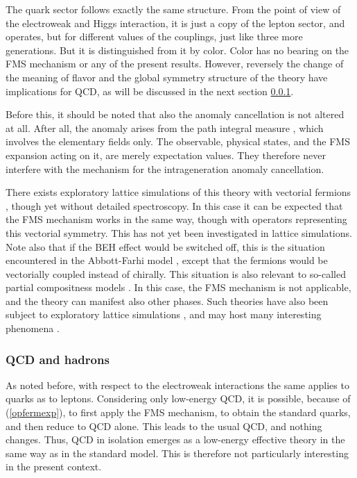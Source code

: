 \documentclass[final,12pt,3p,longtitle]{elsarticle}
\newcommand*{\pref}[1]{(\ref{#1})}
\newcommand*{\1}{1\!\!\!\bot}
\begin{document}
The quark sector follows exactly the same structure. From the point of view of the electroweak and Higgs interaction, it is just a copy of the lepton sector, and operates, but for different values of the couplings, just like three more generations. But it is distinguished from it by color. Color has no bearing on the FMS mechanism or any of the present results. However, reversely the change of the meaning of flavor and the global symmetry structure of the theory have implications for QCD, as will be discussed in the next section \ref{ss:qcd}.

Before this, it should be noted that also the anomaly cancellation is not altered at all. After all, the anomaly arises from the path integral measure \cite{Bohm:2001yx}, which involves the elementary fields only. The observable, physical states, and the FMS expansion acting on it, are merely expectation values. They therefore never interfere with the mechanism for the intrageneration anomaly cancellation.

There exists exploratory lattice simulations of this theory with vectorial fermions \cite{Lee:1987zu,Aoki:1988aw}, though yet without detailed spectroscopy. In this case it can be expected that the FMS mechanism works in the same way, though with operators representing this vectorial symmetry. This has not yet been investigated in lattice simulations. Note also that if the BEH effect would be switched off, this is the situation encountered in the Abbott-Farhi model \cite{Abbott:1981re}, except that the fermions would be vectorially coupled instead of chirally. This situation is also relevant to so-called partial compositness models \cite{Kaplan:1991dc,Sannino:2016sfx}. In this case, the FMS mechanism is not applicable, and the theory can manifest also other phases. Such theories have also been subject to exploratory lattice simulations \cite{Lee:1987zu,Aoki:1988aw,Aoki:1988fg,Hansen:2017mrt}, and may host many interesting phenomena \cite{Lee:1988ut,Hsu:1993zc}.

\subsubsection{QCD and hadrons}\label{ss:qcd}

As noted before, with respect to the electroweak interactions the same applies to quarks as to leptons. Considering only low-energy QCD, it is possible, because of \pref{opfermexp}, to first apply the FMS mechanism, to obtain the standard quarks, and then reduce to QCD alone. This leads to the usual QCD, and nothing changes. Thus, QCD in isolation emerges as a low-energy effective theory in the same way as in the standard model. This is therefore not particularly interesting in the present context.
\end{document}
